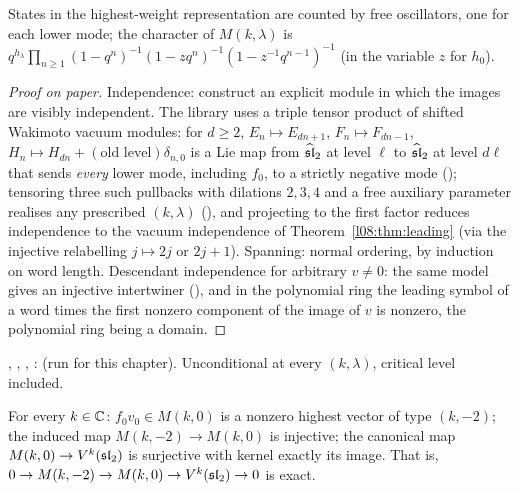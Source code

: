 \begin{physics}
States in the highest-weight representation are counted by free oscillators, one for each lower mode;
the character of $M(k,\lambda)$ is $q^{h_\lambda}\prod_{n\ge1}(1-q^n)^{-1}(1-zq^{n})^{-1}(1-z^{-1}q^{n-1})^{-1}$
(in the variable $z$ for $h_0$).
\end{physics}

\begin{proof}[Proof on paper]
Independence: construct an explicit module in which the images are visibly independent. The library
uses a triple tensor product of shifted Wakimoto vacuum modules: for $d\ge2$, $E_n\mapsto E_{dn+1}$,
$F_n\mapsto F_{dn-1}$, $H_n\mapsto H_{dn}+(\text{old level})\delta_{n,0}$ is a Lie map from $\widehat{\mathfrak{sl}}_2$ at
level $\ell$ to $\widehat{\mathfrak{sl}}_2$ at level $d\ell$ that sends \emph{every} lower mode, including $f_0$, to a strictly
negative mode (); tensoring three such pullbacks with dilations
$2,3,4$ and a free auxiliary parameter realises any prescribed $(k,\lambda)$ (),
and projecting to the first factor reduces independence to the vacuum independence of
Theorem~\ref{l08:thm:leading} (via the injective relabelling $j\mapsto 2j$ or $2j+1$). Spanning: normal
ordering, by induction on word length. Descendant independence for arbitrary $v\ne0$: the same model
gives an injective intertwiner (\allowbreak{}\allowbreak{}\allowbreak{}), and in the polynomial ring the
leading symbol of a word times the first nonzero component of the image of $v$ is nonzero, the
polynomial ring being a domain.
\end{proof}

\begin{status}
\allowbreak{}\allowbreak{}\allowbreak{}\allowbreak{}\allowbreak{}, \allowbreak{},
, \allowbreak{}: \lean{[propext, Classical.}\allowbreak{}\allowbreak\lean{sound]}
(run for this chapter). Unconditional at every $(k,\lambda)$, critical level included.
\end{status}

\begin{theorem}\label{l08:thm:exact}
For every $k\in{\mathbb{C}}$: $f_0v_0\in M(k,0)$ is a nonzero highest vector of type $(k,-2)$; the induced map
$M(k,-2)\to M(k,0)$ is injective; the canonical map $M(k,0)\to V^k(\mathfrak{sl}_2)$ is surjective with kernel
exactly its image. That is, $0\to M(k,-2)\to M(k,0)\to V^k(\mathfrak{sl}_2)\to0$ is exact.
\end{theorem}

